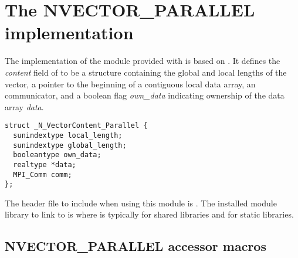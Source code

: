 %
\section{The NVECTOR\_PARALLEL implementation}\label{ss:nvec_par}

The {\nvecp} implementation of the {\nvector} module provided with
{\sundials} is based on {\mpi}.  It defines the {\em content}
field of  to be a structure containing the global and local lengths
of the vector, a pointer to the beginning of a contiguous local data array,
an {\mpi} communicator, and a boolean flag {\em own\_data} indicating ownership of
the data array {\em data}.
\begin{verbatim}
struct _N_VectorContent_Parallel {
  sunindextype local_length;
  sunindextype global_length;
  booleantype own_data;
  realtype *data;
  MPI_Comm comm;
};
\end{verbatim}

The header file to include when using this module is .
The installed module library to link to is
where  is typically  for shared libraries and 
for static libraries.


\subsection{NVECTOR\_PARALLEL accessor macros}
\label{ss:nvec_par_macros}

